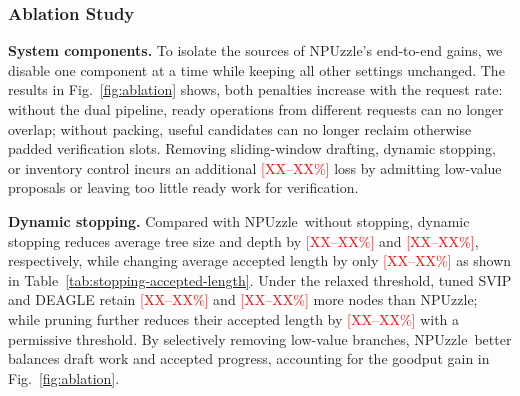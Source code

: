 \documentclass[sigconf,nonacm,10pt]{acmart}
\newcommand{\name}{NPUzzle\xspace}
\begin{document}
{{\subsubsection{Ablation Study}
\noindent\textbf{System components.}
To isolate the sources of \name's end-to-end gains, we disable one component at
a time while keeping all other settings unchanged. The results in Fig.~\ref{fig:ablation} shows, both penalties increase with the
request rate: without the dual pipeline, ready operations from different
requests can no longer overlap; without packing, useful candidates can no
longer reclaim otherwise padded verification slots. Removing sliding-window
drafting, dynamic stopping, or inventory control incurs an additional
\textcolor{red}{[XX--XX\%]} loss by admitting low-value proposals or leaving
too little ready work for verification.

\noindent\textbf{Dynamic stopping.}
Compared with \name\ without stopping, dynamic stopping reduces average tree
size and depth by \textcolor{red}{[XX--XX\%]} and
\textcolor{red}{[XX--XX\%]}, respectively, while changing average accepted
length by only \textcolor{red}{[XX--XX\%]} as shown in Table~\ref{tab:stopping-accepted-length}. Under the relaxed threshold, tuned SVIP and DEAGLE retain \textcolor{red}{[XX--XX\%]} and \textcolor{red}{[XX--XX\%]} more nodes than \name; while pruning further reduces their accepted length by \textcolor{red}{[XX--XX\%]} with a permissive threshold. By selectively removing
low-value branches, \name\ better balances draft work and accepted progress,
accounting for the goodput gain in Fig.~\ref{fig:ablation}.

}}
\end{document}
